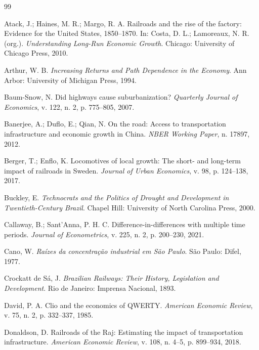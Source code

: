 \documentclass[12pt,a4paper]{article}
\begin{document}
\begin{thebibliography}{99}


Atack, J.; Haines, M. R.; Margo, R. A. Railroads and the rise of the factory: Evidence for the United States, 1850--1870. In: Costa, D. L.; Lamoreaux, N. R. (org.). \textit{Understanding Long-Run Economic Growth}. Chicago: University of Chicago Press, 2010.


Arthur, W. B. \textit{Increasing Returns and Path Dependence in the Economy}. Ann Arbor: University of Michigan Press, 1994.

Baum-Snow, N. Did highways cause suburbanization? \textit{Quarterly Journal of Economics}, v. 122, n. 2, p. 775--805, 2007.

Banerjee, A.; Duflo, E.; Qian, N. On the road: Access to transportation infrastructure and economic growth in China. \textit{NBER Working Paper}, n. 17897, 2012.

Berger, T.; Enflo, K. Locomotives of local growth: The short- and long-term impact of railroads in Sweden. \textit{Journal of Urban Economics}, v. 98, p. 124--138, 2017.

Buckley, E. \textit{Technocrats and the Politics of Drought and Development in Twentieth-Century Brazil}. Chapel Hill: University of North Carolina Press, 2000.

Callaway, B.; Sant'Anna, P. H. C. Difference-in-differences with multiple time periods. \textit{Journal of Econometrics}, v. 225, n. 2, p. 200--230, 2021.


Cano, W. \textit{Raízes da concentração industrial em São Paulo}. São Paulo: Difel, 1977.

Crockatt de Sá, J. \textit{Brazilian Railways: Their History, Legislation and Development}. Rio de Janeiro: Imprensa Nacional, 1893.


David, P. A. Clio and the economics of QWERTY. \textit{American Economic Review}, v. 75, n. 2, p. 332--337, 1985.

Donaldson, D. Railroads of the Raj: Estimating the impact of transportation infrastructure. \textit{American Economic Review}, v. 108, n. 4--5, p. 899--934, 2018.


\end{thebibliography}
\end{document}
